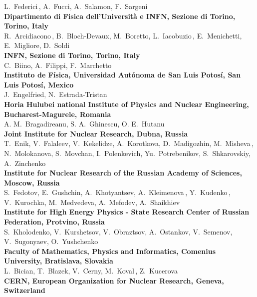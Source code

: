 \begin{raggedright}
 L.~Federici$\,$\footnotemark[7],
 A.~Fucci,
 A.~Salamon,
 F.~Sargeni$\,$\footnotemark[14]\\[2mm]
{\bf Dipartimento di Fisica dell'Universit\`a e INFN, Sezione di Torino, Torino, Italy}\\
 R.~Arcidiacono$\,$\footnotemark[15],
 B.~Bloch-Devaux,
 M.~Boretto,
 L.~Iacobuzio$\,$\footnotemark[9],
 E.~Menichetti,
 E.~Migliore,
 D.~Soldi\\[2mm]
{\bf INFN, Sezione di Torino, Torino, Italy}\\
 C.~Biino,
 A.~Filippi,
 F.~Marchetto\\[2mm]
{\bf Instituto de F\'isica, Universidad Aut\'onoma de San Luis Potos\'i, San Luis Potos\'i, Mexico}\\
 J.~Engelfried,
 N.~Estrada-Tristan\\[2mm]
{\bf Horia Hulubei national Institute of Physics and Nuclear Engineering, Bucharest-Magurele, Romania}\\
 A. M.~Bragadireanu,
 S. A.~Ghinescu,
 O. E.~Hutanu\\[2mm]
{\bf Joint Institute for Nuclear Research, Dubna, Russia}\\
 T.~Enik,
 V.~Falaleev,
 V.~Kekelidze,
 A.~Korotkova,
 D.~Madigozhin,
 M.~Misheva$\,$\footnotemark[16],
 N.~Molokanova,
 S.~Movchan,
 I.~Polenkevich,
 Yu.~Potrebenikov,
 S.~Shkarovskiy,
 A.~Zinchenko$\,$\renewcommand{\thefootnote}{\fnsymbol{footnote}}\footnotemark[2]\renewcommand{\thefootnote}{\arabic{footnote}}\\[2mm]
{\bf Institute for Nuclear Research of the Russian Academy of Sciences, Moscow, Russia}\\
 S.~Fedotov,
 E.~Gushchin,
 A.~Khotyantsev,
 A.~Kleimenova$\,$\footnotemark[17],
 Y.~Kudenko$\,$\footnotemark[18],
 V.~Kurochka,
 M.~Medvedeva,
 A.~Mefodev,
 A.~Shaikhiev\\[2mm]
{\bf Institute for High Energy Physics - State Research Center of Russian Federation, Protvino, Russia}\\
 S.~Kholodenko,
 V.~Kurshetsov,
 V.~Obraztsov,
 A.~Ostankov,
 V.~Semenov,
 V.~Sugonyaev,
 O.~Yushchenko\\[2mm]
{\bf Faculty of Mathematics, Physics and Informatics, Comenius University, Bratislava, Slovakia}\\
 L.~Bician,
 T.~Blazek,
 V.~Cerny,
 M.~Koval$\,$\footnotemark[7],
 Z.~Kucerova\\[2mm]
{\bf CERN,  European Organization for Nuclear Research, Geneva, Switzerland}\\

\end{raggedright}
